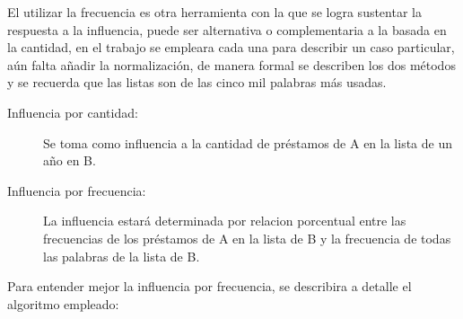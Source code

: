 El utilizar la frecuencia es otra herramienta con la que se logra sustentar la respuesta a la influencia, puede ser alternativa o complementaria a la basada en la cantidad, en el trabajo se empleara cada una para describir un caso particular, aún falta añadir la normalización,  de manera formal se describen los dos métodos y se recuerda que las listas son de las cinco mil palabras más usadas. 

\begin{description}
	
	\item[Influencia por cantidad:] Se toma como influencia a la cantidad de préstamos de A en la lista de un año en B.
	
	\item[Influencia por frecuencia:] La influencia estará determinada por relacion porcentual entre las frecuencias de los préstamos de A en la lista de B y la frecuencia de todas las palabras de la lista de B. 
	
\end{description}


Para entender mejor  la influencia por frecuencia, se describira a detalle el algoritmo empleado:

